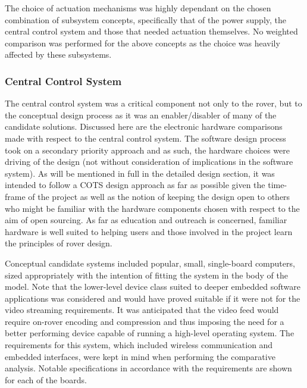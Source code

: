         The choice of actuation mechanisms was highly dependant on the chosen combination of subsystem concepts, specifically that of the power supply, the central control system and those that needed actuation themselves. No weighted comparison was performed for the above concepts as the choice was heavily affected by these subsystems.
    
    \subsubsection{Central Control System}
    \label{subsubsec:central-control-system}
      The central control system was a critical component not only to the rover, but to the conceptual design process as it was an enabler/disabler of many of the candidate solutions. Discussed here are the electronic hardware comparisons made with respect to the central control system. The software design process took on a secondary priority approach and as such, the hardware choices were driving of the design (not without consideration of implications in the software system). As will be mentioned in full in the detailed design section, it was intended to follow a COTS design approach as far as possible given the time-frame of the project as well as the notion of keeping the design open to others who might be familiar with the hardware components chosen with respect to the aim of open sourcing. As far as education and outreach is concerned, familiar hardware is well suited to helping users and those involved in the project learn the principles of rover design.
      
      Conceptual candidate systems included popular, small, single-board computers, sized appropriately with the intention of fitting the system in the body of the model. Note that the lower-level device class suited to deeper embedded software applications was considered and would have proved suitable if it were not for the video streaming requirements. It was anticipated that the video feed would require on-rover encoding and compression and thus imposing the need for a better performing device capable of running a high-level operating system. The requirements for this system, which included wireless communication and embedded interfaces, were kept in mind when performing the comparative analysis. Notable specifications in accordance with the requirements are shown for each of the boards.
      
